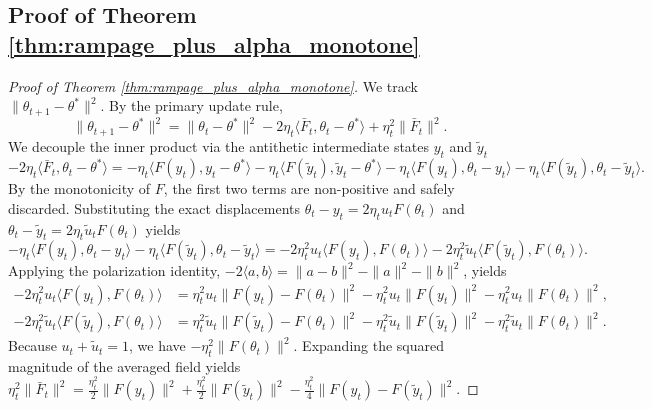 \documentclass[letter,11pt]{article}
\begin{document}
\subsection{Proof of Theorem \ref{thm:rampage_plus_alpha_monotone}}\label{sec:rampage_plus_alpha_monotone}
\begin{proof}[Proof of Theorem \ref{thm:rampage_plus_alpha_monotone}]
We track $\|\theta_{t+1} - \theta^*\|^2$. By the primary update rule,
\begin{equation}
\|\theta_{t+1} - \theta^*\|^2 = \|\theta_t - \theta^*\|^2 - 2\eta_t \langle \bar{F}_t, \theta_t - \theta^* \rangle + \eta_t^2 \|\bar{F}_t\|^2.
\end{equation}
We decouple the inner product via the antithetic intermediate states $y_t$ and $\tilde{y}_t$
\begin{equation}
-2\eta_t \langle \bar{F}_t, \theta_t - \theta^* \rangle = -\eta_t \langle F(y_t), y_t - \theta^* \rangle - \eta_t \langle F(\tilde{y}_t), \tilde{y}_t - \theta^* \rangle - \eta_t \langle F(y_t), \theta_t - y_t \rangle - \eta_t \langle F(\tilde{y}_t), \theta_t - \tilde{y}_t \rangle.
\end{equation}
By the monotonicity of $F$, the first two terms are non-positive and safely discarded. Substituting the exact displacements $\theta_t - y_t = 2\eta_t u_t F(\theta_t)$ and $\theta_t - \tilde{y}_t = 2\eta_t \tilde{u}_t F(\theta_t)$ yields
\begin{equation}
-\eta_t \langle F(y_t), \theta_t - y_t \rangle - \eta_t \langle F(\tilde{y}_t), \theta_t - \tilde{y}_t \rangle = -2\eta_t^2 u_t \langle F(y_t), F(\theta_t) \rangle - 2\eta_t^2 \tilde{u}_t \langle F(\tilde{y}_t), F(\theta_t) \rangle.
\end{equation}
Applying the polarization identity, $-2\langle a, b \rangle = \|a-b\|^2 - \|a\|^2 - \|b\|^2$, yields
\begin{equation}
\begin{aligned}
-2\eta_t^2 u_t \langle F(y_t), F(\theta_t) \rangle &= \eta_t^2 u_t \|F(y_t) - F(\theta_t)\|^2 - \eta_t^2 u_t \|F(y_t)\|^2 - \eta_t^2 u_t \|F(\theta_t)\|^2, \\
-2\eta_t^2 \tilde{u}_t \langle F(\tilde{y}_t), F(\theta_t) \rangle &= \eta_t^2 \tilde{u}_t \|F(\tilde{y}_t) - F(\theta_t)\|^2 - \eta_t^2 \tilde{u}_t \|F(\tilde{y}_t)\|^2 - \eta_t^2 \tilde{u}_t \|F(\theta_t)\|^2.
\end{aligned}
\end{equation}
Because $u_t + \tilde{u}_t = 1$, we have $-\eta_t^2 \|F(\theta_t)\|^2$. Expanding the squared magnitude of the averaged field yields $\eta_t^2 \|\bar{F}_t\|^2 = \frac{\eta_t^2}{2} \|F(y_t)\|^2 + \frac{\eta_t^2}{2} \|F(\tilde{y}_t)\|^2 - \frac{\eta_t^2}{4} \|F(y_t) - F(\tilde{y}_t)\|^2$.


\end{proof}
\end{document}
